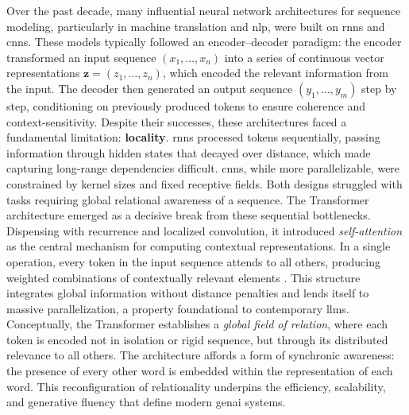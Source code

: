 Over the past decade, many influential neural network architectures for
sequence modeling, particularly in machine translation and \gls{nlp}, were built
on \glspl{rnn} and \glspl{cnn}. These models typically followed an
encoder–decoder paradigm: the encoder transformed an input sequence
\( (x_1, \dots, x_n) \) into a series of continuous vector representations
\( \mathbf{z} = (z_1, \dots, z_n) \), which encoded the relevant information from
the input. The decoder then generated an output sequence
\( (y_1, \dots, y_m) \) step by step, conditioning on previously produced tokens
to ensure coherence and context-sensitivity. Despite their successes, these architectures faced a fundamental limitation:
\textbf{locality}. \glspl{rnn} processed tokens sequentially, passing information
through hidden states that decayed over distance, which made capturing
long-range dependencies difficult. \glspl{cnn}, while more parallelizable, were
constrained by \gls{kernel} sizes and fixed receptive fields. Both designs
struggled with tasks requiring global relational awareness of a sequence. The Transformer architecture \parencite{vaswani2017a} emerged as a decisive
break from these sequential bottlenecks. Dispensing with recurrence and
localized convolution, it introduced \emph{self-attention} as the central
mechanism for computing contextual representations. In a single operation, every
\gls{token} in the input sequence attends to all others, producing
weighted combinations of contextually relevant elements \parencite[4]{vaswani2017a}.
This structure integrates global information without distance penalties and
lends itself to massive parallelization, a property foundational to
contemporary \glspl{llm}. Conceptually, the Transformer establishes a \emph{global field of relation},
where each token is encoded not in isolation or rigid sequence, but through its
distributed relevance to all others. The architecture affords a form of
synchronic awareness: the presence of every other word is embedded within the
representation of each word. This reconfiguration of relationality underpins the
efficiency, scalability, and generative fluency that define modern \gls{genai}
systems.

